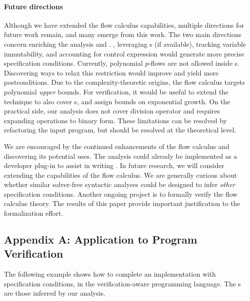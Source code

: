 \paragraph*{Future directions}
Although we have extended the flow calculus capabilities,
multiple directions for future work remain, and many emerge from this work. The
two main directions concern enriching the analysis  and
. \Eg, leveraging s (if available), tracking
variable immutability, and accounting for control expression would generate more
precise specification conditions. Currently, polynomial \(p\)-flows are not
allowed inside s. Discovering ways to relax this restriction
would improve  and yield more postconditions. Due to the
complexity-theoretic origins, the flow
calculus  targets polynomial \emph{upper} bounds. For verification, it would be useful to extend the technique to also
cover s, and assign bounds on exponential growth. On the
practical side, our analysis does not cover division operator and requires
expanding operations to binary form. These limitations can be resolved by
refactoring the input program, but should be resolved at the theoretical level.

We are encouraged by the continued enhancements of the flow
calculus and discovering its potential uses. The analysis
could already be implemented as a developer plug-in to assist in writing
. In future research, we will consider extending the
capabilities of the flow calculus. We are generally curious
about whether similar solver-free syntactic analyses could be designed to infer
\emph{other} specification conditions. Another ongoing
project is to formally verify the flow calculus
theory. The results of this paper provide important justification to the
formalization effort.

\clearpage

\subsection{Appendix A: Application to Program Verification}
\label{app:sec:verified}

The following example shows how to complete an implementation with
specification conditions, in the verification-aware
 programming language. The s are those inferred by
our analysis.

